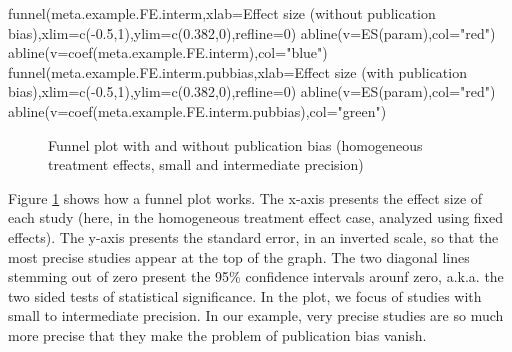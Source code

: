 \documentclass[
]{book}
\newenvironment{Shaded}{\begin{snugshade}}{\end{snugshade}}
\newcommand{\AttributeTok}[1]{\textcolor[rgb]{0.77,0.63,0.00}{#1}}
\newcommand{\DecValTok}[1]{\textcolor[rgb]{0.00,0.00,0.81}{#1}}
\newcommand{\FloatTok}[1]{\textcolor[rgb]{0.00,0.00,0.81}{#1}}
\newcommand{\FunctionTok}[1]{\textcolor[rgb]{0.00,0.00,0.00}{#1}}
\newcommand{\NormalTok}[1]{#1}
\newcommand{\SpecialCharTok}[1]{\textcolor[rgb]{0.00,0.00,0.00}{#1}}
\newcommand{\StringTok}[1]{\textcolor[rgb]{0.31,0.60,0.02}{#1}}
\theoremstyle{definition}
\theoremstyle{definition}
\theoremstyle{definition}
\theoremstyle{definition}
\theoremstyle{remark}
\begin{document}
\begin{Shaded}
\begin{Highlighting}[]
\FunctionTok{funnel}\NormalTok{(meta.example.FE.interm,}\AttributeTok{xlab=}\StringTok{\textquotesingle{}Effect size (without publication bias)\textquotesingle{}}\NormalTok{,}\AttributeTok{xlim=}\FunctionTok{c}\NormalTok{(}\SpecialCharTok{{-}}\FloatTok{0.5}\NormalTok{,}\DecValTok{1}\NormalTok{),}\AttributeTok{ylim=}\FunctionTok{c}\NormalTok{(}\FloatTok{0.382}\NormalTok{,}\DecValTok{0}\NormalTok{),}\AttributeTok{refline=}\DecValTok{0}\NormalTok{)}
\FunctionTok{abline}\NormalTok{(}\AttributeTok{v=}\FunctionTok{ES}\NormalTok{(param),}\AttributeTok{col=}\StringTok{"red"}\NormalTok{)}
\FunctionTok{abline}\NormalTok{(}\AttributeTok{v=}\FunctionTok{coef}\NormalTok{(meta.example.FE.interm),}\AttributeTok{col=}\StringTok{"blue"}\NormalTok{)}
\FunctionTok{funnel}\NormalTok{(meta.example.FE.interm.pubbias,}\AttributeTok{xlab=}\StringTok{\textquotesingle{}Effect size (with publication bias)\textquotesingle{}}\NormalTok{,}\AttributeTok{xlim=}\FunctionTok{c}\NormalTok{(}\SpecialCharTok{{-}}\FloatTok{0.5}\NormalTok{,}\DecValTok{1}\NormalTok{),}\AttributeTok{ylim=}\FunctionTok{c}\NormalTok{(}\FloatTok{0.382}\NormalTok{,}\DecValTok{0}\NormalTok{),}\AttributeTok{refline=}\DecValTok{0}\NormalTok{)}
\FunctionTok{abline}\NormalTok{(}\AttributeTok{v=}\FunctionTok{ES}\NormalTok{(param),}\AttributeTok{col=}\StringTok{"red"}\NormalTok{)}
\FunctionTok{abline}\NormalTok{(}\AttributeTok{v=}\FunctionTok{coef}\NormalTok{(meta.example.FE.interm.pubbias),}\AttributeTok{col=}\StringTok{"green"}\NormalTok{)}
\end{Highlighting}
\end{Shaded}

\begin{figure}[htbp]

{\centering {}

}

\caption{Funnel plot with and without publication bias (homogeneous treatment effects, small and intermediate precision)}\label{fig:FunnelPlotFE}
\end{figure}

Figure \ref{fig:FunnelPlotFE} shows how a funnel plot works.
The x-axis presents the effect size of each study (here, in the homogeneous treatment effect case, analyzed using fixed effects).
The y-axis presents the standard error, in an inverted scale, so that the most precise studies appear at the top of the graph.
The two diagonal lines stemming out of zero present the 95\% confidence intervals arounf zero, a.k.a. the two sided tests of statistical significance.
In the plot, we focus of studies with small to intermediate precision.
In our example, very precise studies are so much more precise that they make the problem of publication bias vanish.
\end{document}
